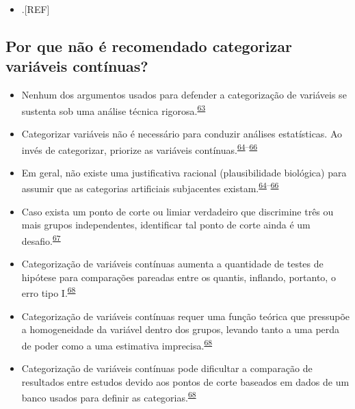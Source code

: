 \documentclass[
  a4paper,
]{book}
\providecommand{\tightlist}{%
  \setlength{\itemsep}{0pt}\setlength{\parskip}{0pt}}
\begin{document}
\begin{itemize}
\tightlist
\item
  .{[}REF{]}
\end{itemize}

\hypertarget{por-que-nuxe3o-uxe9-recomendado-categorizar-variuxe1veis-contuxednuas}{%
\subsection{Por que não é recomendado categorizar variáveis contínuas?}\label{por-que-nuxe3o-uxe9-recomendado-categorizar-variuxe1veis-contuxednuas}}

\begin{itemize}
\item
  Nenhum dos argumentos usados para defender a categorização de variáveis se sustenta sob uma análise técnica rigorosa.\textsuperscript{\protect\hyperlink{ref-MacCallum2002}{63}}
\item
  Categorizar variáveis não é necessário para conduzir análises estatísticas. Ao invés de categorizar, priorize as variáveis contínuas.\textsuperscript{\protect\hyperlink{ref-Altman2006}{64}--\protect\hyperlink{ref-Collins2016}{66}}
\item
  Em geral, não existe uma justificativa racional (plausibilidade biológica) para assumir que as categorias artificiais subjacentes existam.\textsuperscript{\protect\hyperlink{ref-Altman2006}{64}--\protect\hyperlink{ref-Collins2016}{66}}
\item
  Caso exista um ponto de corte ou limiar verdadeiro que discrimine três ou mais grupos independentes, identificar tal ponto de corte ainda é um desafio.\textsuperscript{\protect\hyperlink{ref-Prince2017}{67}}
\item
  Categorização de variáveis contínuas aumenta a quantidade de testes de hipótese para comparações pareadas entre os quantis, inflando, portanto, o erro tipo I.\textsuperscript{\protect\hyperlink{ref-Bennette2012}{68}}
\item
  Categorização de variáveis contínuas requer uma função teórica que pressupõe a homogeneidade da variável dentro dos grupos, levando tanto a uma perda de poder como a uma estimativa imprecisa.\textsuperscript{\protect\hyperlink{ref-Bennette2012}{68}}
\item
  Categorização de variáveis contínuas pode dificultar a comparação de resultados entre estudos devido aos pontos de corte baseados em dados de um banco usados para definir as categorias.\textsuperscript{\protect\hyperlink{ref-Bennette2012}{68}}
\end{itemize}
\end{document}
